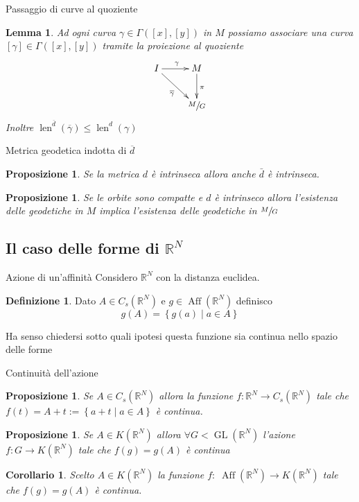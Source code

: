 \documentclass{beamer}
\newcounter{counter1}
\theoremstyle{plain}
\newtheorem{mylem}[counter1]{Lemma}
\newtheorem{mypro}[counter1]{Proposizione}
\newtheorem{mycor}[counter1]{Corollario}
\theoremstyle{definition}
\newtheorem{mydef}[counter1]{Definizione}
\theoremstyle{remark}
\newcommand{\obar}[1]{\overline{#1}}
\newcommand{\set}[1]{\left\{#1\right\}}
\newcommand{\pa}[1]{\left(#1\right)}
\newcommand{\bra}[1]{\left[#1\right]}
\DeclareMathOperator{\len}{len}
\DeclareMathOperator{\gl}{GL}
\DeclareMathOperator{\aff}{Aff}
\begin{document}
\begin{frame}{Passaggio di curve al quoziente}
  \begin{mylem}
    Ad ogni curva $\gamma \in \Gamma ( \bra{x}, \bra{y} )$ in $M$
    possiamo associare una curva $\bra{\gamma} \in \Gamma( \bra{x},
    \bra{y})$ tramite la proiezione al quoziente
    \[ 
    \xymatrix{I \ar[r]^\gamma \ar[dr] _{\obar \gamma}& M \ar[d]^\pi \\
      & \sfrac{M}{G}  
    }
    \]
    Inoltre $\len ^{\obar d} \pa{ \obar \gamma} \le \len ^d \pa{\gamma}$
  \end{mylem}
\end{frame}

\begin{frame}{Metrica geodetica indotta di $\obar d$}
  \begin{mypro}
    Se la metrica $d$ è intrinseca allora anche $\bar d$ è intrinseca.
  \end{mypro}
  \begin{mypro}
    Se le orbite sono compatte e $d$ è intrinseco allora l'esistenza
    delle geodetiche in $M$ implica l'esistenza delle geodetiche in
    $\sfrac{M}{G}$
  \end{mypro}
\end{frame}

\subsection{Il caso delle forme di $\mathbb{R}^N$}

\begin{frame}{Azione di un'affinità}
  Considero $\mathbb{R}^N$ con la distanza euclidea.
  \begin{mydef}
    Dato $A \in C_s(\mathbb{R}^N)$ e $g \in \aff (\mathbb{R}^N)$
    definisco
    \[ g(A) = \set{ g(a) \mid a \in A } \]
  \end{mydef}
  Ha senso chiedersi sotto quali ipotesi questa funzione sia continua
  nello spazio delle forme
\end{frame}

\begin{frame}{Continuità dell'azione}
  \begin{mypro}
    Se $A \in C_s(\mathbb{R}^N)$ allora la funzione $f: \mathbb{R}^N \to
    C_s(\mathbb{R}^N)$ tale che $f(t) = A + t := \set { a + t \mid a \in
      A}$ è continua.
  \end{mypro}
  \begin{mypro}
    Se $A \in K(\mathbb{R}^N)$ allora $\forall G < \gl (\mathbb{R}^N)$
    l'azione $f: G \rightarrow K(\mathbb{R}^N)$ tale che $f(g) = g(A)$
    è continua
  \end{mypro}
  \begin{mycor}
    Scelto $A \in K(\mathbb{R}^N)$ la funzione $f:\; \aff( \mathbb{R}^N)
    \to K(\mathbb{R}^N)$ tale che $f(g) = g(A)$ è continua.
  \end{mycor}
\end{frame}
\end{document}
